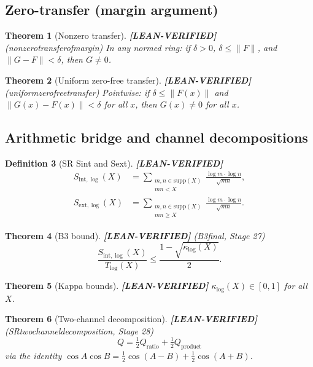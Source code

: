 \documentclass[11pt]{article}
\newtheorem{theorem}{Theorem}[section]
\newtheorem{definition}[theorem]{Definition}
\theoremstyle{remark}
\newcommand{\LEANVERIFIED}{\textbf{\color{green!60!black}[LEAN-VERIFIED]}}
\DeclareRobustCommand{\_}{\ifmmode\text{\textunderscore}\else\textunderscore\allowbreak\fi}
\begin{document}
\subsection{Zero-transfer (margin argument)}

\begin{theorem}[Nonzero transfer] \LEANVERIFIED{} \textnormal{(nonzero\_transfer\_of\_margin)}
In any normed ring: if $\delta > 0$, $\delta \leq \|F\|$, and $\|G - F\| < \delta$,
then $G \neq 0$.
\end{theorem}

\begin{theorem}[Uniform zero-free transfer] \LEANVERIFIED{} \textnormal{(uniform\_zero\_free\_transfer)}
Pointwise: if $\delta \leq \|F(x)\|$ and $\|G(x) - F(x)\| < \delta$ for all $x$,
then $G(x) \neq 0$ for all $x$.
\end{theorem}

\subsection{Arithmetic bridge and channel decompositions}

\begin{definition}[SR Sint and Sext] \LEANVERIFIED{}
\begin{align*}
S_{\mathrm{int},\log}(X) &= \sum_{\substack{m,n \in \mathrm{supp}(X) \\ mn < X}} \frac{\log m \cdot \log n}{\sqrt{mn}}, \\
S_{\mathrm{ext},\log}(X) &= \sum_{\substack{m,n \in \mathrm{supp}(X) \\ mn \geq X}} \frac{\log m \cdot \log n}{\sqrt{mn}}.
\end{align*}
\end{definition}

\begin{theorem}[B3 bound] \LEANVERIFIED{} \textnormal{(B3\_final, Stage 27)}
\[
\frac{S_{\mathrm{int},\log}(X)}{T_{\log}(X)} \leq \frac{1 - \sqrt{\kappa_{\log}(X)}}{2}.
\]
\end{theorem}

\begin{theorem}[Kappa bounds] \LEANVERIFIED{}
$\kappa_{\log}(X) \in [0, 1]$ for all $X$.
\end{theorem}

\begin{theorem}[Two-channel decomposition] \LEANVERIFIED{} \textnormal{(SR\_two\_channel\_decomposition, Stage 28)}
\[
Q = \tfrac{1}{2}Q_{\mathrm{ratio}} + \tfrac{1}{2}Q_{\mathrm{product}}
\]
via the identity $\cos A \cos B = \frac{1}{2}\cos(A-B) + \frac{1}{2}\cos(A+B)$.
\end{theorem}
\end{document}

